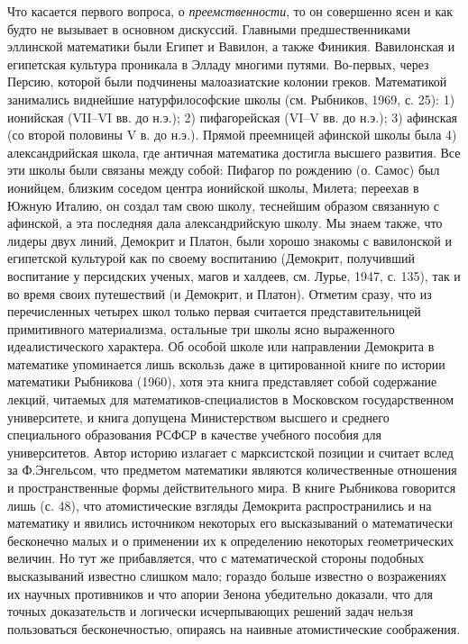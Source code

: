 Что  касается   первого  вопроса,  о  \emph{преемственности},   то  он
совершенно ясен и как будто не вызывает в основном дискуссий. Главными
предшественниками эллинской математики были  Египет и Вавилон, а также
Финикия. Вавилонская и египетская  культура проникала в Элладу многими
путями. Во-первых, через Персию,  которой были подчинены малоазиатские
колонии  греков.  Математикой  занимались  виднейшие  натурфилософские
школы (см. Рыбников, 1969, с. 25):  1) ионийская (VII--VI вв. до н.э.);
2) пифагорейская (VI--V вв. до н.э.); 3) афинская (со второй половины V
в. до н.э.). Прямой преемницей  афинской школы была 4) александрийская
школа,  где античная  математика  достигла высшего  развития. Все  эти
школы были  связаны между  собой: Пифагор по  рождению (о.  Самос) был
ионийцем, близким  соседом центра ионийской школы,  Милета; переехав в
Южную Италию, он создал там  свою школу, теснейшим образом связанную с
афинской, а эта последняя дала  александрийскую школу. Мы знаем также,
что  лидеры  двух  линий,  Демокрит  и  Платон,  были  хорошо  знакомы
с  вавилонской  и  египетской   культурой  как  по  своему  воспитанию
(Демокрит, получивший воспитание у персидских ученых, магов и халдеев,
см.  Лурье,  1947, с.  135),  так  и  во  время своих  путешествий  (и
Демокрит, и Платон). Отметим сразу,  что из перечисленных четырех школ
только первая считается  представительницей примитивного материализма,
остальные три  школы ясно  выраженного идеалистического  характера. Об
особой  школе  или  направлении  Демокрита  в  математике  упоминается
лишь  вскользь  даже  в   цитированной  книге  по  истории  математики
Рыбникова (1960), хотя эта книга представляет собой содержание лекций,
читаемых  для  математиков-специалистов в  Московском  государственном
университете,  и  книга  допущена  Министерством  высшего  и  среднего
специального  образования  РСФСР  в   качестве  учебного  пособия  для
университетов. Автор историю излагает с марксистской позиции и считает
вслед за Ф.Энгельсом, что предметом математики являются количественные
отношения  и  пространственные  формы действительного  мира.  В  книге
Рыбникова говорится лишь (с. 48), что атомистические взгляды Демокрита
распространились и  на математику  и явились источником  некоторых его
высказываний  о математически  бесконечно малых  и о  применении их  к
определению некоторых геометрических величин.  Но тут же прибавляется,
что с  математической стороны  подобных высказываний  известно слишком
мало; гораздо больше  известно о возражениях их  научных противников и
что апории  Зенона убедительно доказали, что  для точных доказательств
и   логически   исчерпывающих   решений  задач   нельзя   пользоваться
бесконечностью, опираясь на наивные атомистические соображения.

